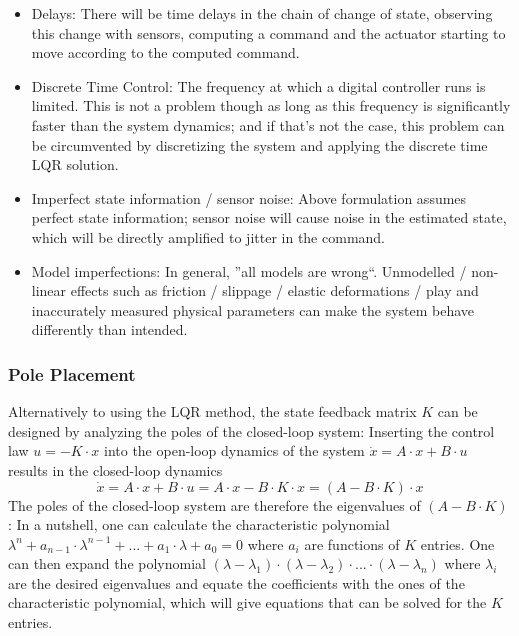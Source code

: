 \documentclass{article}
\begin{document}
\begin{itemize}
	\item Delays: There will be time delays in the chain of change of state, observing this change with sensors, computing a command and the actuator starting to move according to the computed command.
	\item Discrete Time Control: The frequency at which a digital controller runs is limited. This is not a problem though as long as this frequency is significantly faster than the system dynamics; and if that's not the case, this problem can be circumvented by discretizing the system and applying the discrete time LQR solution.
	\item Imperfect state information / sensor noise: Above formulation assumes perfect state information; sensor noise will cause noise in the estimated state, which will be directly amplified to jitter in the command.
	\item Model imperfections: In general, ''all models are wrong``.
	Unmodelled / non-linear effects such as friction / slippage / elastic deformations / play and inaccurately measured physical parameters can make the system behave differently than intended.
\end{itemize}

\subsubsection{Pole Placement}
Alternatively to using the LQR method, the state feedback matrix $K$ can be designed by analyzing the poles of the closed-loop system:
Inserting the control law $u = -K \cdot x$ into the open-loop dynamics of the system $\dot{x} = A \cdot x + B \cdot u$ results in the closed-loop dynamics
\begin{equation}
\dot{x} = A \cdot x + B \cdot u = A \cdot x - B \cdot K \cdot x = (A - B \cdot K) \cdot x
\end{equation}
The poles of the closed-loop system are therefore the eigenvalues of $(A - B \cdot K)$:
In a nutshell, one can calculate the characteristic polynomial $\lambda^n + a_{n-1} \cdot \lambda^{n-1} + ... + a_1  \cdot \lambda + a_0 = 0$ where $a_i$ are functions of $K$ entries.
One can then expand the polynomial $(\lambda-\lambda_1) \cdot (\lambda-\lambda_2) \cdot ... \cdot (\lambda-\lambda_n)$ where $\lambda_i$ are the desired eigenvalues and equate the coefficients with the ones of the characteristic polynomial, which will give equations that can be solved for the $K$ entries.
\end{document}
